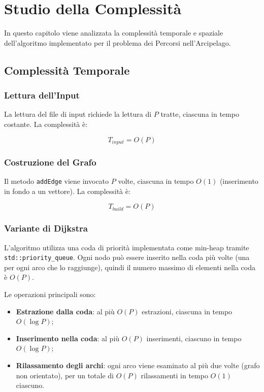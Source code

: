 \chapter{Studio della Complessità}

In questo capitolo viene analizzata la complessità temporale e spaziale 
dell'algoritmo implementato per il problema dei Percorsi nell'Arcipelago.

\section{Complessità Temporale}

\subsection{Lettura dell'Input}

La lettura del file di input richiede la lettura di $P$ tratte, ciascuna 
in tempo costante. La complessità è:

\begin{equation}
    T_{input} = O(P)
\end{equation}

\subsection{Costruzione del Grafo}

Il metodo \texttt{addEdge} viene invocato $P$ volte, ciascuna in tempo 
$O(1)$ (inserimento in fondo a un vettore). La complessità è:

\begin{equation}
    T_{build} = O(P)
\end{equation}

\subsection{Variante di Dijkstra}

L'algoritmo utilizza una coda di priorità implementata come min-heap 
tramite \texttt{std::priority\_queue}. Ogni nodo può essere inserito 
nella coda più volte (una per ogni arco che lo raggiunge), quindi il 
numero massimo di elementi nella coda è $O(P)$.

Le operazioni principali sono:

\begin{itemize}
    \item \textbf{Estrazione dalla coda}: al più $O(P)$ estrazioni, 
    ciascuna in tempo $O(\log P)$;
    \item \textbf{Inserimento nella coda}: al più $O(P)$ inserimenti, 
    ciascuno in tempo $O(\log P)$;
    \item \textbf{Rilassamento degli archi}: ogni arco viene esaminato 
    al più due volte (grafo non orientato), per un totale di $O(P)$ 
    rilassamenti in tempo $O(1)$ ciascuno.
\end{itemize}


